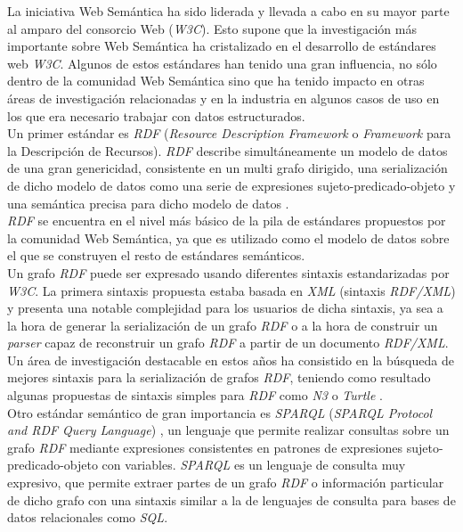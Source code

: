 La iniciativa Web Sem\'antica ha sido liderada y llevada a cabo en su mayor parte al amparo del consorcio Web (\textit{W3C}). Esto supone que la investigaci\'on m\'as importante sobre Web Sem\'antica ha cristalizado en el desarrollo de est\'andares web \textit{W3C}. Algunos de estos est\'andares han tenido una gran influencia, no s\'olo dentro de la comunidad Web Sem\'antica sino que ha tenido impacto en otras \'areas de investigaci\'on relacionadas y en la industria en algunos casos de uso en los que era necesario trabajar con datos estructurados.\\
Un primer est\'andar es \textit{RDF} (\textit{Resource Description Framework} o \textit{Framework} para la Descripci\'on de Recursos). \textit{RDF} describe simult\'aneamente un modelo de datos de una gran genericidad, consistente en un multi grafo dirigido, una serializaci\'on de dicho modelo de datos como una serie de expresiones sujeto-predicado-objeto y una sem\'antica precisa para dicho modelo de datos \cite{hayes2004rdf}.\\
\textit{RDF} se encuentra en el nivel m\'as b\'asico de la pila de est\'andares propuestos por la comunidad Web Sem\'antica, ya que es utilizado como el modelo de datos sobre el que se construyen el resto de est\'andares sem\'anticos.\\
Un grafo \textit{RDF} puede ser expresado usando diferentes sintaxis estandarizadas por \textit{W3C}. La primera sintaxis propuesta estaba basada en \textit{XML} (sintaxis \textit{RDF/XML}) \cite{beckett2004rdf} y presenta una notable complejidad para los usuarios de dicha sintaxis, ya sea a la hora de generar la serializaci\'on de un grafo \textit{RDF} o a la hora de construir un \textit{parser} capaz de reconstruir un grafo \textit{RDF} a partir de un documento \textit{RDF/XML}. Un \'area de investigaci\'on destacable en estos a\~nos ha consistido en la b\'usqueda de mejores sintaxis para la serializaci\'on de grafos \textit{RDF}, teniendo como resultado algunas propuestas de sintaxis simples para \textit{RDF} como \textit{N3} \cite{n3} o \textit{Turtle} \cite{turtle}.\\
Otro est\'andar sem\'antico de gran importancia es \textit{SPARQL} (\textit{SPARQL Protocol and RDF Query Language}) \cite{sparql}, un lenguaje que permite realizar consultas sobre un grafo \textit{RDF} mediante expresiones consistentes en patrones de expresiones sujeto-predicado-objeto con variables. \textit{SPARQL} es un lenguaje de consulta muy expresivo, que permite extraer partes de un grafo \textit{RDF} o informaci\'on particular de dicho grafo con una sintaxis similar a la de lenguajes de consulta para bases de datos relacionales como \textit{SQL}.\\
